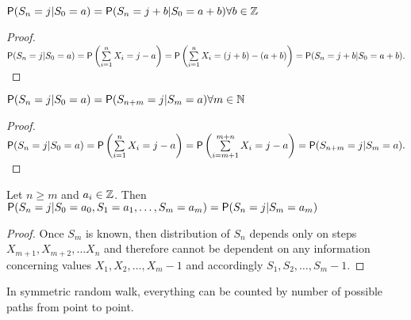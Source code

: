 \begin{lemma}
  $\operatorname{\textsf{P}}(S_n=j|S_0=a)=\operatorname{\textsf{P}}(S_n=j+b|S_0=a+b) \forall b \in \mathbb{Z}$
\end{lemma}
\begin{proof}
  $\pr(S_n=j|S_0=a)=\pr \left(\suma X_i=j-a\right)=\pr \left(\suma X_i=(j+b)-(a+b)\right)=\pr(S_n=j+b|S_0=a+b).$
\end{proof}

\begin{lemma}
  $\operatorname{\textsf{P}}(S_n=j|S_0=a)=\operatorname{\textsf{P}}(S_{n+m}=j|S_m=a) \forall m \in \mathbb{N}$
\end{lemma}
\begin{proof}
  $\pr(S_n=j|S_0=a)=\pr\left(\suma X_i=j-a \right)=\pr\left(\suma[i][m+1][m+n]X_i=j-a \right)=\pr(S_{n+m}=j|S_m=a).$
\end{proof}

\begin{lemma}
  Let $n\geq m$ and $a_i \in \mathbb{Z}$. Then $\operatorname{\textsf{P}}(S_n=j|S_0=a_0, S_1=a_1, \ldots, S_m=a_m)=\operatorname{\textsf{P}}(S_n=j|S_m=a_m)$
\end{lemma}
\begin{proof}
  Once $S_m$ is known, then distribution of $S_n$ depends only on steps $X_{m+1}, X_{m+2}, \ldots X_n$ and therefore cannot be dependent on any information concerning values $X_1, X_2, \ldots, X_m-1$ and accordingly $S_1, S_2, \ldots, S_m-1.$
\end{proof}

\begin{rem}
  In symmetric random walk, everything can be counted by number of possible paths from point to point.
\end{rem}

